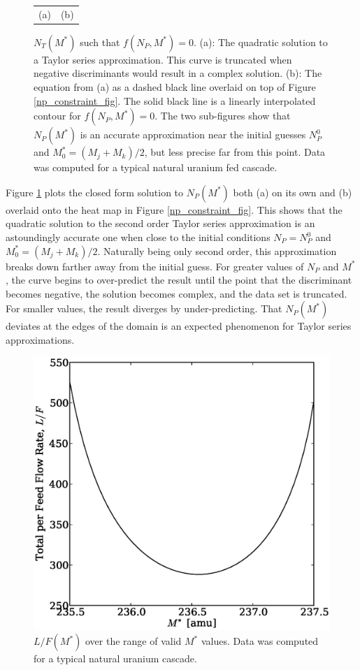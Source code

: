 \documentclass[preprint,12pt]{elsarticle}
\begin{document}
\begin{figure}[htpb]
\begin{center}
\begin{tabular}{cc}
(a) & (b) \\
\end{tabular}
\caption{$N_T(M^*)$ such that $f(N_P,M^*)=0$.  (a): The quadratic solution to a
Taylor series approximation. This curve is truncated when negative discriminants 
would result in a complex solution.  (b): The equation from (a) as a dashed black 
line overlaid on top of Figure \ref{np_constraint_fig}.  The solid black line is a 
linearly interpolated contour for $f(N_P, M^*)=0$. The two sub-figures show that 
$N_P(M^*)$ is an accurate  approximation near the initial guesses $N_P^0$ and 
$M_0^*=(M_j+M_k)/2$, but less precise far from this point. Data was computed for 
a typical natural uranium fed cascade.}
\label{np_closed_fig}
\end{center}
\end{figure}

Figure \ref{np_closed_fig} plots the closed form solution to $N_P(M^*)$ both (a)
on its own and (b) overlaid onto the heat map in Figure \ref{np_constraint_fig}.  
This shows that the 
quadratic solution to the second order Taylor series approximation is an astoundingly 
accurate one when close to the initial conditions $N_P=N_P^0$ and $M_0^*=(M_j+M_k)/2$.
Naturally being only second order, this approximation breaks down farther away from 
the initial guess.  For greater values of $N_P$ and $M^*$, the curve begins to 
over-predict the result until the point that the discriminant becomes negative, the
solution becomes complex, and the data set is truncated.  For smaller values, the
result diverges by under-predicting.  That $N_P(M^*)$ deviates at the edges of the
domain is an expected phenomenon for Taylor series approximations.

\begin{figure}[htpb]
\begin{center}
\includegraphics[scale=0.5]{loverf.eps}
\caption{$L/F(M^*)$ over the range of valid $M^*$ values.
Data was computed for a typical natural uranium cascade.}
\label{loverf_fig}
\end{center}
\end{figure}
\end{document}
